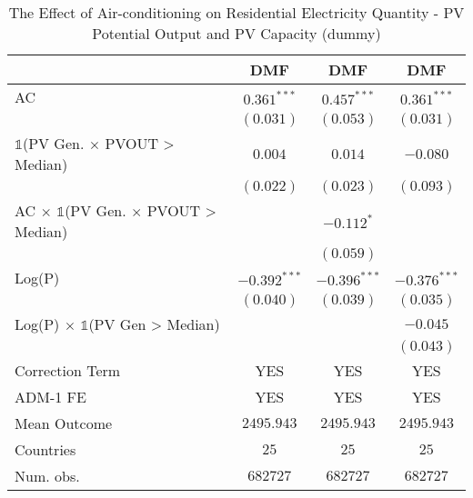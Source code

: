 
\begin{table}[htbp]
\caption{The Effect of Air-conditioning on Residential Electricity Quantity - PV Potential Output and PV Capacity (dummy)}
\begin{center}
\begin{tabular}{l c c c}
\hline
 & DMF & DMF & DMF \\
\hline
AC                                                        & $0.361^{***}$  & $0.457^{***}$  & $0.361^{***}$  \\
                                                          & $(0.031)$      & $(0.053)$      & $(0.031)$      \\
$\mathds{1}$(PV Gen. $\times$ PVOUT > Median)             & $0.004$        & $0.014$        & $-0.080$       \\
                                                          & $(0.022)$      & $(0.023)$      & $(0.093)$      \\
AC $\times$ $\mathds{1}$(PV Gen. $\times$ PVOUT > Median) &                & $-0.112^{*}$   &                \\
                                                          &                & $(0.059)$      &                \\
Log(P)                                                    & $-0.392^{***}$ & $-0.396^{***}$ & $-0.376^{***}$ \\
                                                          & $(0.040)$      & $(0.039)$      & $(0.035)$      \\
Log(P) $\times$ $\mathds{1}$(PV Gen > Median)             &                &                & $-0.045$       \\
                                                          &                &                & $(0.043)$      \\
\hline
Correction Term                                           & YES            & YES            & YES            \\
ADM-1 FE                                                  & YES            & YES            & YES            \\
Mean Outcome                                              & $2495.943$     & $2495.943$     & $2495.943$     \\
Countries                                                 & $25$           & $25$           & $25$           \\
Num. obs.                                                 & $682727$       & $682727$       & $682727$       \\

\end{tabular}
\end{center}
\end{table}
